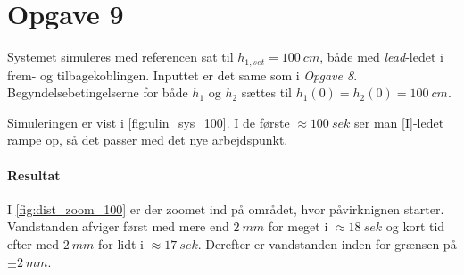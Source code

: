 \section{Opgave 9}
	Systemet simuleres med referencen sat til $h_{1,set} = 100~cm$, både med
	\emph{lead}-ledet i frem- og tilbagekoblingen. Inputtet er det same som i
	\emph{Opgave 8}. Begyndelsebetingelserne for både $h_1$ og $h_2$ sættes til
	$h_1(0) = h_2(0) = 100~cm$.
	
	Simuleringen er vist i \ref{fig:ulin_sys_100}. I de første $\approx 100~sek$
	ser man \ref{I}-ledet rampe op, så det passer med det nye arbejdspunkt.
	
\paragraph{Resultat}
	I \ref{fig:dist_zoom_100} er der zoomet ind på området, hvor påvirknignen
	starter. Vandstanden afviger først med mere end $2~mm$ for meget i $\approx
	18~sek$ og kort tid efter med $2~mm$ for lidt i $\approx
	17~sek$. Derefter er vandstanden inden for grænsen på $\pm 2~mm$.
	
